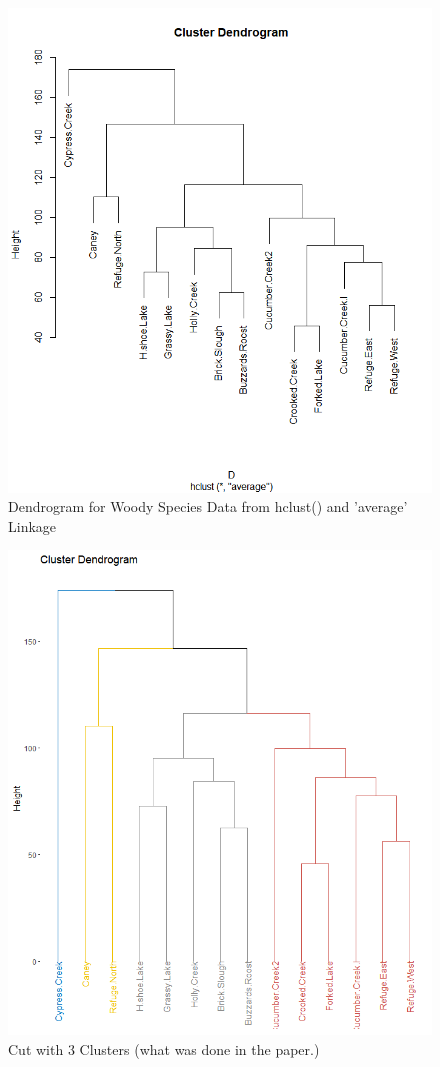 \documentclass[12pt]{article}
\makeatletter
\theoremstyle{homework}
\newenvironment{exercise}[1]
{\def\@currentlabel{#1}\exercisecore}
{\endexercisecore}
\makeatother
\begin{document}
\begin{exercise}{2}
\begin{enumerate}
  \begin{figure}[H]
    \begin{center}
      \caption{Dendrogram for Woody Species Data from hclust() and 'average' Linkage}
    \includegraphics[width = .70\textwidth]{Rplot06.png}
    \end{center}
  \end{figure}
  
  \begin{figure}[H]
    \begin{center}
      \caption{Cut with 3 Clusters (what was done in the paper.)}
    \includegraphics[width = .70\textwidth]{Rplot07.png}
    \end{center}
  \end{figure}


\end{enumerate}
\end{exercise}
\end{document}
